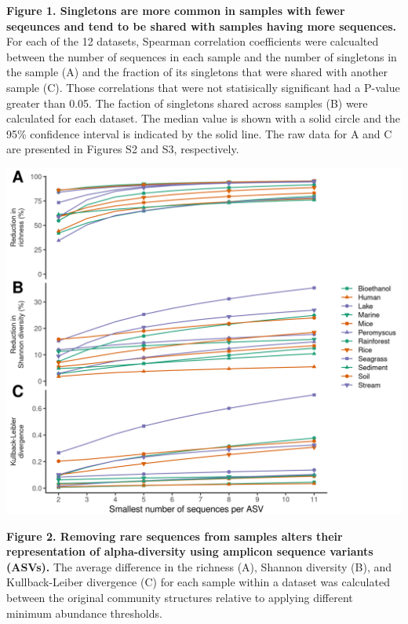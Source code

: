 \documentclass[
]{article}
\begin{document}
\textbf{Figure 1. Singletons are more common in samples with fewer
seqeunces and tend to be shared with samples having more sequences.} For
each of the 12 datasets, Spearman correlation coefficients were
calcualted between the number of sequences in each sample and the number
of singletons in the sample (A) and the fraction of its singletons that
were shared with another sample (C). Those correlations that were not
statisically significant had a P-value greater than 0.05. The faction of
singletons shared across samples (B) were calculated for each dataset.
The median value is shown with a solid circle and the 95\% confidence
interval is indicated by the solid line. The raw data for A and C are
presented in Figures S2 and S3, respectively.

\newpage

\includegraphics{figure_2.png}

\textbf{Figure 2. Removing rare sequences from samples alters their
representation of alpha-diversity using amplicon sequence variants
(ASVs).} The average difference in the richness (A), Shannon diversity
(B), and Kullback-Leiber divergence (C) for each sample within a dataset
was calculated between the original community structures relative to
applying different minimum abundance thresholds.

\newpage
\end{document}
